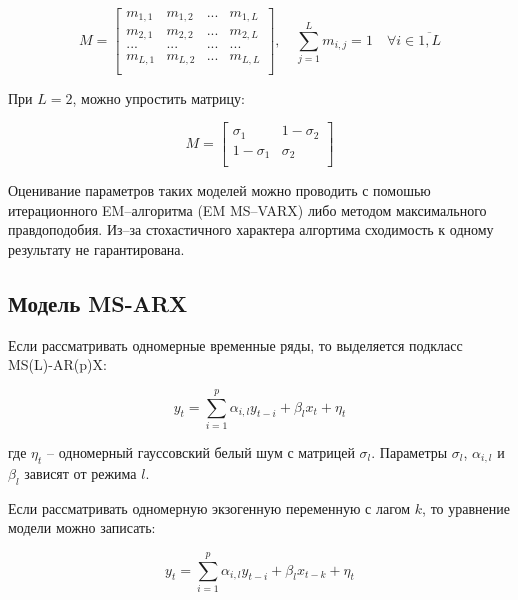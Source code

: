 \documentclass[../report.tex]{subfiles}
\begin{document}
	\begin{equation}
	\label{eq:M_matrix}
	M=
	\left[ {\begin{array}{cccc}
		m_{1,1} & m_{1,2} & ... & m_{1,L} \\
		m_{2,1} & m_{2,2} & ... & m_{2,L} \\
		... & ... & ... & ... \\
		m_{L,1} & m_{L,2} & ... & m_{L,L} \\
		\end{array} } \right]
	, \quad
	\sum_{j=1}^{L} m_{i,j} = 1 \quad \forall i \in \overline{1,L}
	\end{equation}
	
	При $L=2$, можно упростить матрицу:
	
	\begin{equation}
	\label{eq:M_simplified}
	M=
	\left[ {\begin{array}{cc}
		\sigma_{1} & 1-\sigma_{2} \\
		1-\sigma_{1} & \sigma_{2} \\
		\end{array} } \right]
	\end{equation}
	
	Оценивание параметров таких моделей можно проводить с помошью итерационного EM–алгоритма (EM MS–VARX) \cite{malNovopMSVARX} либо методом максимального правдоподобия. Из–за стохастичного характера алгортима сходимость к одному результату не гарантирована.
	
	
	\subsection{Модель MS-ARX}
	
	Если рассматривать одномерные временные ряды, то выделяется подкласс MS(L)-AR(p)X:
	
	\begin{equation}  
	y_{t}=\sum_{i=1}^{p} \alpha_{i,l} y_{t-i} + \beta_{l} x_{t} + \eta_{t}
	\end{equation}
	
	где $\eta_{t}$ – одномерный гауссовский белый шум с матрицей $\sigma_{l}$. Параметры $\sigma_{l}$, $\alpha_{i,l}$ и $\beta_{l}$ зависят от режима $l$.
	
	Если рассматривать одномерную экзогенную переменную с лагом $k$, то уравнение модели можно записать:
	
	\begin{equation}  
	y_{t}=\sum_{i=1}^{p} \alpha_{i,l} y_{t-i} + \beta_{l} x_{t-k} + \eta_{t}
	\end{equation}
	
\end{document}
